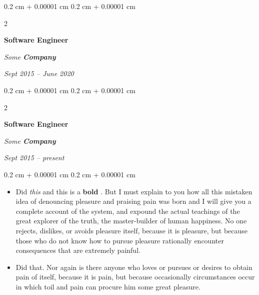 \documentclass[10pt, letterpaper]{article}
\newenvironment{highlights}{
    \begin{itemize}[
        topsep=0.10 cm,
        parsep=0.10 cm,
        partopsep=0pt,
        itemsep=0pt,
        leftmargin=0.4 cm + 10pt
    ]
}{
    \end{itemize}
} %
\newenvironment{onecolentry}{
    \begin{adjustwidth}{
        0.2 cm + 0.00001 cm
    }{
        0.2 cm + 0.00001 cm
    }
}{
    \end{adjustwidth}
} %
\newenvironment{twocolentry}[2][]{
    \onecolentry
    \def\secondColumn{#2}
    \setcolumnwidth{\fill, 4.5 cm}
    \begin{paracol}{2}
}{
    \switchcolumn \raggedleft \secondColumn
    \end{paracol}
    \endonecolentry
} %
\let\hrefWithoutArrow\href
\renewcommand{\href}[2]{\hrefWithoutArrow{#1}{\ifthenelse{\equal{#2}{}}{ }{#2 }\raisebox{.15ex}{\footnotesize \faExternalLink*}}}
\begin{document}
        \vspace{0.2 cm}

            \begin{twocolentry}{


        \textit{Sept 2015 – June 2020}    }
                \textbf{Software Engineer}

                \textit{Some \textbf{Company}}
            \end{twocolentry}



        \vspace{0.2 cm}

            \begin{twocolentry}{


        \textit{Sept 2015 – present}    }
                \textbf{Software Engineer}

                \textit{Some \textbf{Company}}
            \end{twocolentry}

        \vspace{0.10 cm}
        \begin{onecolentry}
            \begin{highlights}
                \item Did \textit{this} and this is a \textbf{bold} \href{https://example.com}{link}. But I must explain to you how all this mistaken idea of denouncing pleasure and praising pain was born and I will give you a complete account of the system, and expound the actual teachings of the great explorer of the truth, the master-builder of human happiness. No one rejects, dislikes, or avoids pleasure itself, because it is pleasure, but because those who do not know how to pursue pleasure rationally encounter consequences that are extremely painful.
                \item Did that. Nor again is there anyone who loves or pursues or desires to obtain pain of itself, because it is pain, but because occasionally circumstances occur in which toil and pain can procure him some great pleasure.
            \end{highlights}
        \end{onecolentry}
\end{document}

